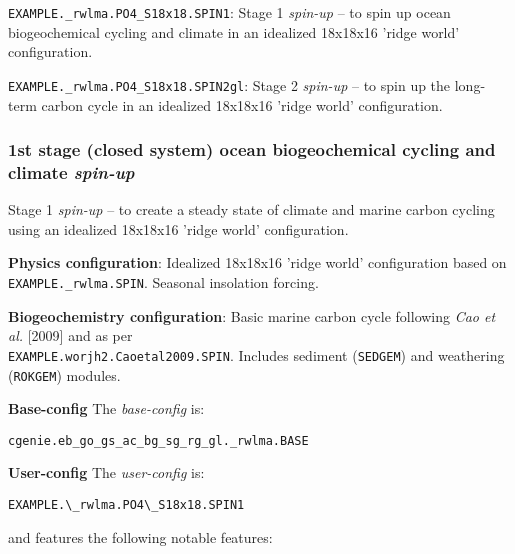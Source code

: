 \documentclass[10pt,twoside]{article}
\begin{document}
\begin{compactenum}
                        
\item \texttt{EXAMPLE.\_rwlma.PO4\_S18x18.SPIN1}: Stage 1 \textit{spin-up} -- to spin up ocean biogeochemical cycling and climate in an idealized 18x18x16 'ridge world' configuration.
                        
\item \texttt{EXAMPLE.\_rwlma.PO4\_S18x18.SPIN2gl}: Stage 2 \textit{spin-up} -- to spin up the long-term carbon cycle in an idealized 18x18x16 'ridge world' configuration.                 
                                
\end{compactenum}      


\subsubsection{1st stage (closed system) ocean biogeochemical cycling and climate \textit{spin-up}}\label{EXAMPLE.rwlma.PO4S18x18.SPIN1}

Stage 1 \textit{spin-up} -- to create a steady state of climate and marine carbon cycling using an idealized 18x18x16 'ridge world' configuration.

\noindent \textbf{Physics configuration}: Idealized 18x18x16 'ridge world' configuration based on \texttt{EXAMPLE.\_rwlma.SPIN}. Seasonal insolation forcing.

\noindent \textbf{Biogeochemistry configuration}: Basic marine carbon cycle following \textit{Cao et al.} [2009] and as per
\\ \texttt{EXAMPLE.worjh2.Caoetal2009.SPIN}. Includes sediment (\texttt{SEDGEM}) and weathering (\texttt{ROKGEM}) modules.

\noindent \textbf{Base-config} The \textit{base-config} is:
\vspace{-10pt}\begin{verbatim}cgenie.eb_go_gs_ac_bg_sg_rg_gl._rwlma.BASE\end{verbatim}\vspace{-10pt}

\noindent \textbf{User-config} The \textit{user-config} is:
\vspace{-10pt}\begin{verbatim}EXAMPLE.\_rwlma.PO4\_S18x18.SPIN1\end{verbatim}\vspace{-10pt}
and features the following notable features:
\end{document}

